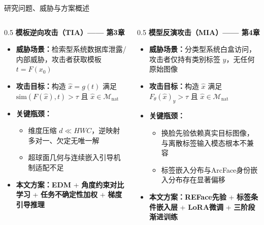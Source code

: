 \documentclass[aspectratio=169,12pt]{beamer}
\renewcommand{\textbf}[1]{\textcolor{hitblue}{\bfseries #1}}
\newcommand{\important}[1]{\textcolor{hitgray}{\textbf{#1}}}
\begin{document}
\begin{frame}{研究问题、威胁与方案概述}
\footnotesize
\begin{columns}[T]
\begin{column}{0.5\textwidth}
\textbf{模板逆向攻击（TIA）—— 第3章}
\begin{itemize}\setlength{\itemsep}{1pt}
  \item \important{威胁场景：}检索型系统数据库泄露/内部威胁，攻击者获取模板 $t\!=\!F(x_0)$
  \item \important{攻击目标：}构造 $\hat{x}\!=\!g(t)$ 满足 $\mathrm{sim}(F(\hat{x}),t)>\tau$ 且 $\hat{x}\!\in\!\mathcal{M}_{\text{nat}}$
  \item \important{关键瓶颈：}
    {\scriptsize\begin{itemize}\setlength{\itemsep}{0pt}
      \item 维度压缩 $d\!\ll\!HWC$，逆映射多对一、欠定无唯一解
      \item 超球面几何与连续嵌入引导机制适配不足
    \end{itemize}}
  \item \important{本文方案：}{\scriptsize \textbf{EDM} + \textbf{角度约束对比学习} + \textbf{任务不确定性加权} + \textbf{梯度引导推理}}
\end{itemize}
\end{column}
\begin{column}{0.5\textwidth}
\textbf{模型反演攻击（MIA）—— 第4章}
\begin{itemize}\setlength{\itemsep}{1pt}
  \item \important{威胁场景：}分类型系统白盒访问，攻击者仅持有类别标签 $y$，无任何原始图像
  \item \important{攻击目标：}构造 $\hat{x}$ 满足 $F_\theta(\hat{x})_y>\tau$ 且 $\hat{x}\!\in\!\mathcal{M}_{\text{nat}}$
  \item \important{关键瓶颈：}
    {\scriptsize\begin{itemize}\setlength{\itemsep}{0pt}
      \item 换脸先验依赖真实目标图像，与离散标签输入模态根本不兼容
      \item 标签嵌入分布与ArcFace身份嵌入分布存在显著偏移
    \end{itemize}}
  \item \important{本文方案：}{\scriptsize \textbf{REFace先验} + \textbf{标签条件嵌入层} + \textbf{LoRA微调} + \textbf{三阶段渐进训练}}
\end{itemize}
\end{column}
\end{columns}
\end{frame} %
\end{document}

